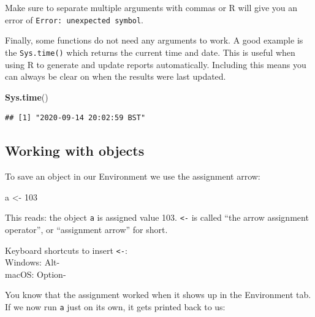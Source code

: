 \documentclass[
  12pt,
  krantz2]{krantz}
\makeatletter
\newenvironment{Shaded}{\begin{snugshade}}{\end{snugshade}}
\newcommand{\DecValTok}[1]{\textcolor[rgb]{0.00,0.00,0.81}{#1}}
\newcommand{\KeywordTok}[1]{\textcolor[rgb]{0.13,0.29,0.53}{\textbf{#1}}}
\newcommand{\NormalTok}[1]{#1}
\newcommand{\StringTok}[1]{\textcolor[rgb]{0.31,0.60,0.02}{#1}}
\renewenvironment{quote}{\begin{VF}}{\end{VF}}
\newenvironment{kframe}{%
\medskip{}
\setlength{\fboxsep}{.8em}
 \def\at@end@of@kframe{}%
 \ifinner\ifhmode%
  \def\at@end@of@kframe{\end{minipage}}%
  \begin{minipage}{\columnwidth}%
 \fi\fi%
 \def\FrameCommand##1{\hskip\@totalleftmargin \hskip-\fboxsep
 \colorbox{shadecolor}{##1}\hskip-\fboxsep
     \hskip-\linewidth \hskip-\@totalleftmargin \hskip\columnwidth}%
 \MakeFramed {\advance\hsize-\width
   \@totalleftmargin\z@ \linewidth\hsize
   \@setminipage}}%
 {\par\unskip\endMakeFramed%
 \at@end@of@kframe}
\renewenvironment{Shaded}{\begin{kframe}}{\end{kframe}}
\makeatother
\begin{document}
\begin{quote}
Make sure to separate multiple arguments with commas or R will give you an error of \texttt{Error:\ unexpected\ symbol}.
\end{quote}

Finally, some functions do not need any arguments to work.
A good example is the \texttt{Sys.time()} which returns the current time and date.
This is useful when using R to generate and update reports automatically.
Including this means you can always be clear on when the results were last updated.


\begin{Shaded}
\begin{Highlighting}[]
\KeywordTok{Sys.time}\NormalTok{()}
\end{Highlighting}
\end{Shaded}

\begin{verbatim}
## [1] "2020-09-14 20:02:59 BST"
\end{verbatim}

\hypertarget{working-with-objects}{%
\subsection{Working with objects}\label{working-with-objects}}

To save an object in our Environment we use the assignment arrow:

\begin{Shaded}
\begin{Highlighting}[]
\NormalTok{a <-}\StringTok{ }\DecValTok{103}
\end{Highlighting}
\end{Shaded}

This reads: the object \texttt{a} is assigned value 103.
\texttt{\textless{}-} is called ``the arrow assignment operator'', or ``assignment arrow'' for short.

\begin{quote}
Keyboard shortcuts to insert \texttt{\textless{}-}:\\
Windows: Alt-\\
macOS: Option-
\end{quote}

You know that the assignment worked when it shows up in the Environment tab.
If we now run \texttt{a} just on its own, it gets printed back to us:
\end{document}
